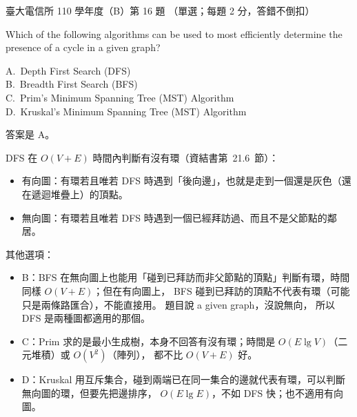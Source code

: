 \begin{pastexam}[label={px:ntu-110-comm-dsa-16}]{臺大電信所 110 學年度（B）第 16 題}
（單選；每題 2 分，答錯不倒扣）

Which of the following algorithms can be used to most efficiently determine the presence of a cycle in a given graph?

A.~Depth First Search (DFS)\\
B.~Breadth First Search (BFS)\\
C.~Prim's Minimum Spanning Tree (MST) Algorithm\\
D.~Kruskal's Minimum Spanning Tree (MST) Algorithm
\end{pastexam}

\begin{pastsoln}
答案是 A。

DFS 在 $O(V + E)$ 時間內判斷有沒有環（資結書第~21.6~節）：
\begin{itemize}
\item 有向圖：有環若且唯若 DFS 時遇到「後向邊」，也就是走到一個還是灰色（還在遞迴堆疊上）的頂點。
\item 無向圖：有環若且唯若 DFS 時遇到一個已經拜訪過、而且不是父節點的鄰居。
\end{itemize}

其他選項：
\begin{itemize}
\item B：BFS 在無向圖上也能用「碰到已拜訪而非父節點的頂點」判斷有環，時間同樣 $O(V + E)$；但在有向圖上，
BFS 碰到已拜訪的頂點不代表有環（可能只是兩條路匯合），不能直接用。 題目說 a given graph，沒說無向，
所以 DFS 是兩種圖都適用的那個。
\item C：Prim 求的是最小生成樹，本身不回答有沒有環；時間是 $O(E\lg V)$（二元堆積）或 $O(V^2)$（陣列），
都不比 $O(V + E)$ 好。
\item D：Kruskal 用互斥集合，碰到兩端已在同一集合的邊就代表有環，可以判斷無向圖的環，但要先把邊排序，
$O(E\lg E)$，不如 DFS 快；也不適用有向圖。
\end{itemize}
\end{pastsoln}
